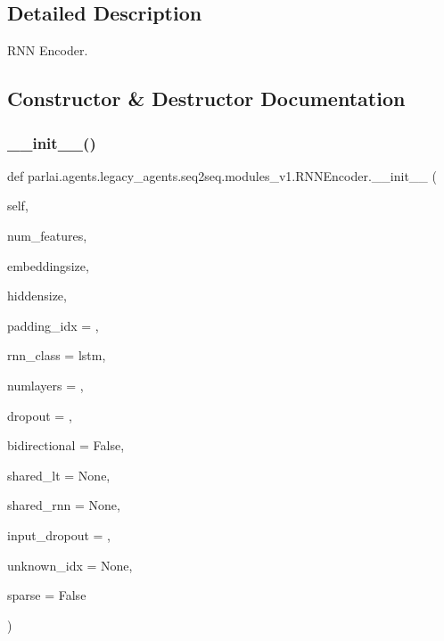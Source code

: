 \subsection{Detailed Description}
\begin{DoxyVerb}RNN Encoder.
\end{DoxyVerb}
 

\subsection{Constructor \& Destructor Documentation}
\mbox{\label{classparlai_1_1agents_1_1legacy__agents_1_1seq2seq_1_1modules__v1_1_1RNNEncoder_aafb69318c92833972f488753adef1744}} 
\subsubsection{\texorpdfstring{\+\_\+\+\_\+init\+\_\+\+\_\+()}{\_\_init\_\_()}}
{\footnotesize\ttfamily def parlai.\+agents.\+legacy\+\_\+agents.\+seq2seq.\+modules\+\_\+v1.\+R\+N\+N\+Encoder.\+\_\+\+\_\+init\+\_\+\+\_\+ (\begin{DoxyParamCaption}\item[{}]{self,  }\item[{}]{num\+\_\+features,  }\item[{}]{embeddingsize,  }\item[{}]{hiddensize,  }\item[{}]{padding\+\_\+idx = {},  }\item[{}]{rnn\+\_\+class = {\ttfamily \textquotesingle{}lstm\textquotesingle{}},  }\item[{}]{numlayers = {},  }\item[{}]{dropout = {},  }\item[{}]{bidirectional = {\ttfamily False},  }\item[{}]{shared\+\_\+lt = {\ttfamily None},  }\item[{}]{shared\+\_\+rnn = {\ttfamily None},  }\item[{}]{input\+\_\+dropout = {},  }\item[{}]{unknown\+\_\+idx = {\ttfamily None},  }\item[{}]{sparse = {\ttfamily False} }\end{DoxyParamCaption})}

